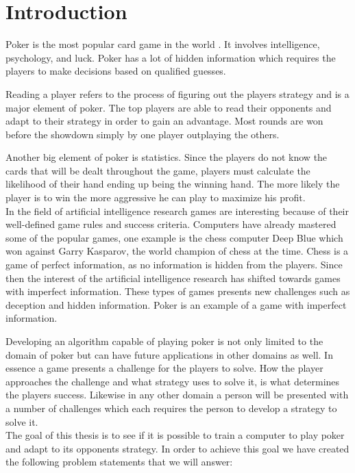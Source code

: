 \section*{Introduction}
Poker is the most popular card game in the world \cite{poker-popular}. It involves intelligence, psychology, and luck. Poker has a lot of hidden information which requires the players to make decisions based on qualified guesses.  

Reading a player refers to the process of figuring out the players strategy and is a major element of poker. The top players are able to read their opponents and adapt to their strategy in order to gain an advantage. Most rounds are won before the showdown simply by one player outplaying the others. 

Another big element of poker is statistics. Since the players do not know the cards that will be dealt throughout the game, players must calculate the likelihood of their hand ending up being the winning hand. The more likely the player is to win the more aggressive he can play to maximize his profit.\\


In the field of artificial intelligence research games are interesting because of their well-defined game rules and success criteria.
Computers have already mastered some of the popular games, one example is the chess computer Deep Blue which won against Garry Kasparov, the world champion of chess at the time.
Chess is a game of perfect information, as no information is hidden from the players.
Since then the interest of the artificial intelligence research has shifted towards games with imperfect information. These types of games presents new challenges such as deception and hidden information. Poker is an example of a game with imperfect information.

Developing an algorithm capable of playing poker is not only limited to the domain of poker but can have future applications in other domains as well. In essence a game presents a challenge for the players to solve. How the player approaches the challenge and what strategy uses to solve it, is what determines the players success. Likewise in any other domain a person will be presented with a number of challenges which each requires the person to develop a strategy to solve it.\\

The goal of this thesis is to see if it is possible to train a computer to play poker and adapt to its opponents strategy. In order to achieve this goal we have created the following problem statements that we will answer:

